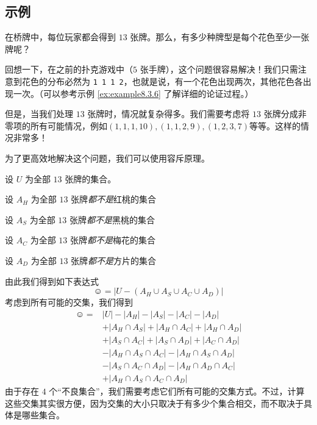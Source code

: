 
\subsection{示例}

\begin{example}[桥牌]

    在桥牌中，每位玩家都会得到 $13$ 张牌。那么，有多少种牌型是每个花色至少一张牌呢？

    回想一下，在之前的扑克游戏中（$5$ 张手牌），这个问题很容易解决！我们只需注意到花色的分布必然为 \verb|1 1 1 2|，也就是说，有一个花色出现两次，其他花色各出现一次。（可以参考示例 \ref{ex:example8.3.6} 了解详细的论证过程。）

    但是，当我们处理 $13$ 张牌时，情况就复杂得多。我们需要考虑将 $13$ 张牌分成非零项的所有可能情况，例如$(1,1,1,10), (1,1,2,9),(1,2,3,7)$等等。这样的情况非常多！

    为了更高效地解决这个问题，我们可以使用容斥原理。

    设 $U$ 为全部 $13$ 张牌的集合。

    设 $A_H$ 为全部 $13$ 张牌\emph{都不是}红桃的集合

    设 $A_S$ 为全部 $13$ 张牌\emph{都不是}黑桃的集合

    设 $A_C$ 为全部 $13$ 张牌\emph{都不是}梅花的集合

    设 $A_D$ 为全部 $13$ 张牌\emph{都不是}方片的集合

    由此我们得到如下表达式
    \[\smiley{} = |U - (A_H \cup A_S \cup A_C \cup A_D)|\]
    考虑到所有可能的交集，我们得到
    \begin{align*}
        \smiley{} = & |U| - |A_H| - |A_S| - |A_C| - |A_D|                 \\
                    & + |A_H \cap A_S| + |A_H \cap A_C| + |A_H \cap A_D|  \\
                    & + |A_S \cap A_C| + |A_S \cap A_D| + |A_C \cap A_D|  \\
                    & - |A_H \cap A_S \cap A_C| - |A_H \cap A_S \cap A_D| \\
                    & - |A_S \cap A_C \cap A_D| - |A_H \cap A_D \cap A_C| \\
                    & + |A_H \cap A_S \cap A_C \cap A_D|
    \end{align*}
    由于存在 $4$ 个``不良集合''，我们需要考虑它们所有可能的交集方式。不过，计算这些交集其实很方便，因为交集的大小只取决于有多少个集合相交，而不取决于具体是哪些集合。


\end{example}
